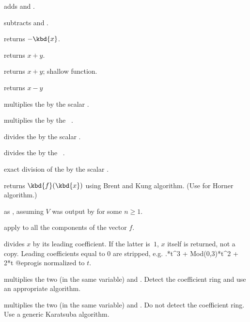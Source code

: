 
 adds  and .

 subtracts  and .

 returns $-\kbd{x}$.

 returns $x+y$.

 returns $x+y$; shallow function.


 returns $x-y$

 multiplies the  
by the scalar .

 multiplies the  
by the ~.

 divides the  
by the scalar .

 divides the  
by the ~.

 exact division of the 
 by the scalar .

 returns $\kbd{f}(\kbd{x})$ using
Brent and Kung algorithm. (Use  for Horner algorithm.)

 as ,
assuming $V$ was output by  for some $n\geq 1$.

 apply 
to all the components of the vector $f$.

 divides $x$ by its
leading coefficient. If the latter is~$1$, $x$ itself is returned, not a
copy. Leading coefficients equal to $0$ are stripped, e.g.
.*t^3 + Mod(0,3)*t^2 + 2*t
@eprog\noindent is normalized to $t$.

 multiplies the two  (in the same
variable)  and . Detect the coefficient ring and use an
appropriate algorithm.

 multiplies the two  (in the same
variable)  and . Do not detect the coefficient ring.
Use a generic Karatsuba algorithm.

